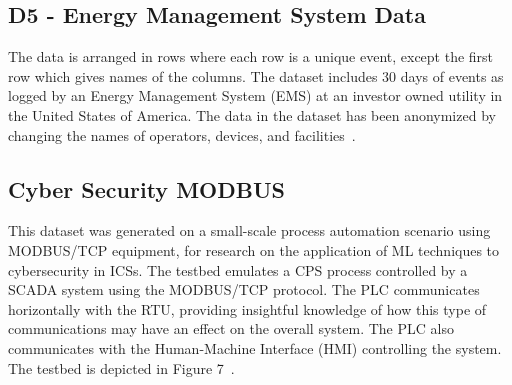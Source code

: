 \documentclass[english,12pt]{article}
\begin{document}

\subsection{D5 - Energy Management System Data} \label{Energy Management System Data}

The data is arranged in rows where each row is a unique event, except the first row which gives names of the columns.
The dataset includes 30 days of events as logged by an Energy Management System (EMS)
at an investor owned utility in the United States of America. The data in the dataset has been anonymized by changing the
names of operators, devices, and facilities~\cite{Tommymorrisd5}. 


\subsection{Cyber Security MODBUS} \label{CYBER-SECURITY MODBUS}

This dataset was generated on a small-scale process automation scenario using MODBUS/TCP equipment, for research
on the application of ML techniques to cybersecurity in ICSs. The testbed emulates a CPS
process controlled by a SCADA system using the MODBUS/TCP protocol. The PLC communicates horizontally with the
RTU, providing insightful knowledge of how this type of communications may have an effect on the overall system.
The PLC also communicates with the Human-Machine Interface (HMI) controlling the system. The testbed is depicted
in Figure 7~\cite{IEEE}.
\end{document}
